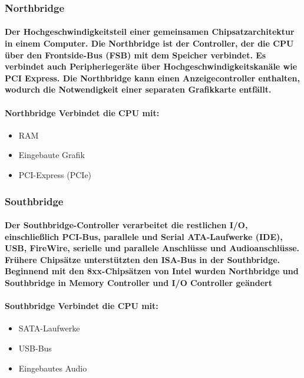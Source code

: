 \documentclass[a4paper]{article}
\begin{document}
    \subsubsection{\color{codegreen}Northbridge}

    \paragraph{\color{codegreen}Der Hochgeschwindigkeitsteil einer gemeinsamen Chipsatzarchitektur in einem Computer. Die Northbridge ist der Controller, der die CPU über den Frontside-Bus (FSB) mit dem Speicher verbindet. Es verbindet auch Peripheriegeräte über Hochgeschwindigkeitskanäle wie PCI Express. Die Northbridge kann einen Anzeigecontroller enthalten, wodurch die Notwendigkeit einer separaten Grafikkarte entfällt.}

    \paragraph{\color{red}Northbridge Verbindet die CPU mit:}
    \begin{itemize}
        \color{magenta}
        \item RAM
        \item Eingebaute Grafik
        \item PCI-Express (PCIe)
    \end{itemize}

    \subsubsection{\color{codegreen}Southbridge}

    \paragraph{\color{codegreen}Der Southbridge-Controller verarbeitet die restlichen I/O, einschließlich PCI-Bus, parallele und Serial ATA-Laufwerke (IDE), USB, FireWire, serielle und parallele Anschlüsse und Audioanschlüsse. Frühere Chipsätze unterstützten den ISA-Bus in der Southbridge. Beginnend mit den 8xx-Chipsätzen von Intel wurden Northbridge und Southbridge in Memory Controller und I/O Controller geändert}

    \paragraph{\color{red}Southbridge Verbindet die CPU mit:}
    \begin{itemize}
        \color{magenta}
        \item SATA-Laufwerke
        \item USB-Bus
        \item Eingebautes Audio
    \end{itemize}
\end{document}

